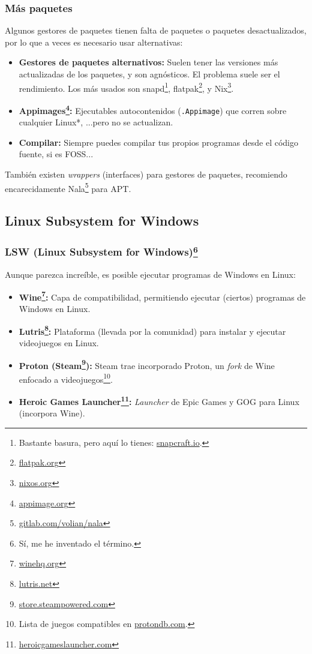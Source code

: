 \documentclass[aspectratio=43]{beamer}
\begin{document}
\begin{frame}
    \frametitle{Más paquetes}
    Algunos gestores de paquetes tienen falta de paquetes o paquetes desactualizados, por lo que a veces es necesario usar alternativas:

    \begin{itemize}
        \item \textbf{Gestores de paquetes alternativos:} Suelen tener las versiones más actualizadas de los paquetes, y son agnósticos. El problema suele ser el rendimiento. Los más usados son snapd\footnote{Bastante basura, pero aquí lo tienes: \href{https://snapcraft.io/}{snapcraft.io}.}, flatpak\footnote{\href{https://flatpak.org/}{flatpak.org}}, y Nix\footnote{\href{https://nixos.org/}{nixos.org}}.
        \item \textbf{Appimages\footnote{\href{https://appimage.org/}{appimage.org}}:} Ejecutables autocontenidos (\texttt{.Appimage}) que corren sobre cualquier Linux*, ...pero no se actualizan. 
        \item \textbf{Compilar:} Siempre puedes compilar tus propios programas desde el código fuente, si es FOSS...
    \end{itemize}

    También existen \textit{wrappers} (interfaces) para gestores de paquetes, recomiendo encarecidamente Nala\footnote{\href{https://gitlab.com/volian/nala}{gitlab.com/volian/nala}} para APT.

\end{frame}

\subsection{Linux Subsystem for Windows}
\begin{frame}
    \frametitle{LSW (Linux Subsystem for Windows)\footnote{Sí, me he inventado el término.}}
    Aunque parezca increíble, es posible ejecutar programas de Windows en Linux:
    
    \begin{itemize}
        \item \textbf{Wine\footnote{\href{https://www.winehq.org/}{winehq.org}}:} Capa de compatibilidad, permitiendo ejecutar (ciertos) programas de Windows en Linux.
        \item \textbf{Lutris\footnote{\href{https://lutris.net/}{lutris.net}}:} Plataforma (llevada por la comunidad) para instalar y ejecutar videojuegos en Linux.
        \item \textbf{Proton (Steam\footnote{\href{https://store.steampowered.com/}{store.steampowered.com}}):} Steam trae incorporado Proton, un \textit{fork} de Wine enfocado a videojuegos\footnote{Lista de juegos compatibles en \href{https://www.protondb.com/}{protondb.com}.}.
        \item \textbf{Heroic Games Launcher\footnote{\href{https://heroicgameslauncher.com/}{heroicgameslauncher.com}}:} \textit{Launcher} de Epic Games y GOG para Linux (incorpora Wine).
    \end{itemize}

\end{frame}
\end{document}
